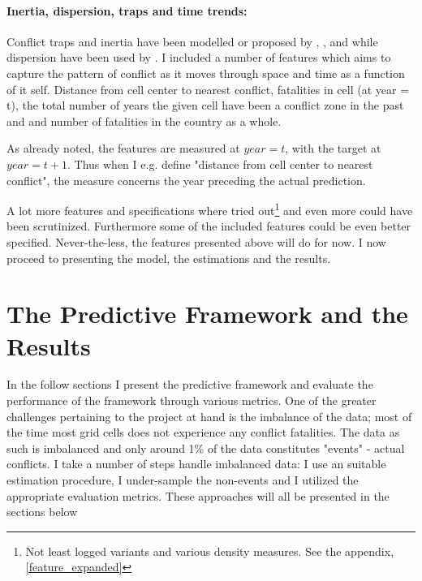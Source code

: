 \documentclass[a4paper]{article}
\begin{document}
\paragraph{Inertia, dispersion, traps and time trends:} Conflict traps and inertia have been modelled or proposed by \cite{Collier_Hoeffler_2004}, \cite{Hegre_Sambanis_2006}, \cite{perry_2013} and \cite{Cederman_Gleditsch_Buhaug_2013} while dispersion have been used by \cite{Goldstone_2010}. I included a number of features which aims to capture the pattern of conflict as it moves through space and time as a function of it self. Distance from cell center to nearest conflict, fatalities in cell (at year = t), the total number of years the given cell have been a conflict zone in the past and  and number of fatalities in the country as a whole.\par

As already noted, the features are measured at $year = t$, with the target at $year = t+1$. Thus when I e.g. define "distance from cell center to nearest conflict", the measure concerns the year preceding the actual prediction.\par

A lot more features and specifications where tried out\footnote{Not least logged variants and various density measures. See the appendix, \autoref{feature_expanded}} and even more could have been scrutinized. Furthermore some of the included features could be even better specified. Never-the-less, the features presented above will do for now. I now proceed to presenting the model, the estimations and the results.

\section{The Predictive Framework and the Results}

In the follow sections I present the predictive framework and evaluate the performance of the framework through various metrics. One of the greater challenges pertaining to the project at hand is the imbalance of the data;  most of the time most grid cells does not experience any conflict fatalities. The data as such is imbalanced and only around 1\% of the data constitutes "events" - actual conflicts. I take a number of steps handle imbalanced data: I use an suitable estimation procedure, I under-sample the non-events and I utilized the appropriate evaluation metrics. These approaches will all be presented in the sections below\par
\end{document}
